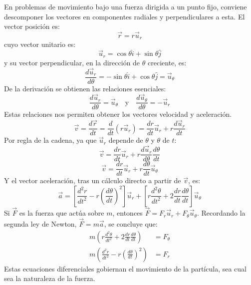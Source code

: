 En problemas de movimiento bajo una fuerza dirigida a un punto fijo, conviene descomponer los vectores en componentes radiales y perpendiculares a esta. El vector posición es:
\[ \vec{r} = r\vec{u}_r \]
cuyo vector unitario es:
\[ \vec{u}_r = \cos\theta \hat{i} + \sin\theta \hat{j} \]
y su vector perpendicular, en la dirección de $\theta$ creciente, es:
\[ \frac{d\vec{u}_r}{d\theta} = -\sin\theta \hat{i} + \cos\theta \hat{j} = \vec{u}_\theta \]
De la derivación se obtienen las relaciones esenciales:
\[ \frac{d\vec{u}_r}{d\theta} = \vec{u}_\theta \quad \text{y} \quad \frac{d\vec{u}_\theta}{d\theta} = -\vec{u}_r \]
Estas relaciones nos permiten obtener los vectores velocidad y aceleración.
\[ \vec{v} = \frac{d\vec{r}}{dt} = \frac{d}{dt}(r\vec{u}_r) = \frac{dr}{dt}\vec{u}_r + r\frac{d\vec{u}_r}{dt} \]
Por regla de la cadena, ya que $\vec{u}_r$ depende de $\theta$ y $\theta$ de $t$:
\[ \vec{v} = \frac{dr}{dt}\vec{u}_r + r\frac{d\vec{u}_r}{d\theta}\frac{d\theta}{dt} \]
\[ \vec{v} = \frac{dr}{dt}\vec{u}_r + r\frac{d\theta}{dt}\vec{u}_\theta \]
Y el vector aceleración, tras un cálculo directo a partir de $\vec{v}$, es:
\[ \vec{a} = \left[\frac{d^2r}{dt^2} - r\left(\frac{d\theta}{dt}\right)^2\right]\vec{u}_r + \left[r\frac{d^2\theta}{dt^2} + 2\frac{dr}{dt}\frac{d\theta}{dt}\right]\vec{u}_\theta \]
Si $\vec{F}$ es la fuerza que actúa sobre $m$, entonces $\vec{F} = F_r\vec{u}_r + F_\theta\vec{u}_\theta$.
Recordando la segunda ley de Newton, $\vec{F}=m\vec{a}$, se concluye que:
\begin{align}
    m\left(r\frac{d^2\theta}{dt^2} + 2\frac{dr}{dt}\frac{d\theta}{dt}\right) &= F_\theta \tag{1} \\
    m\left(\frac{d^2r}{dt^2} - r\left(\frac{d\theta}{dt}\right)^2\right) &= F_r \tag{2}
\end{align}
Estas ecuaciones diferenciales gobiernan el movimiento de la partícula, sea cual sea la naturaleza de la fuerza.

